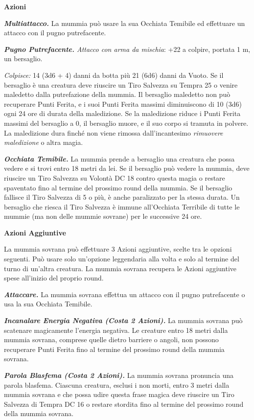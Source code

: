\begin{multicols}{2}
\textbf{Azioni}

\textit{\textbf{Multiattacco.}} La mummia può usare la sua Occhiata Temibile ed effettuare un attacco con il pugno putrefacente.

\textit{\textbf{Pugno Putrefacente.} Attacco con arma da mischia}: +22 a colpire, portata 1 m, un bersaglio.

\textit{Colpisce:} 14 (3d6 + 4) danni da botta più 21 (6d6) danni da Vuoto. Se il bersaglio è una creatura deve riuscire un Tiro Salvezza su Tempra 25 o venire maledetto dalla putrefazione della mummia. Il bersaglio maledetto non può recuperare Punti Ferita, e i suoi Punti Ferita massimi diminuiscono di 10 (3d6) ogni 24 ore di durata della maledizione. Se la maledizione riduce i Punti Ferita massimi del bersaglio a 0, il bersaglio muore, e il suo corpo si tramuta in polvere. La maledizione dura finché non viene rimossa dall'incantesimo \textit{rimuovere maledizione} o altra magia.

\textit{\textbf{Occhiata Temibile.}} La mummia prende a bersaglio una creatura che possa vedere e si trovi entro 18 metri da lei. Se il bersaglio può vedere la mummia, deve riuscire un Tiro Salvezza su Volontà DC 18 contro questa magia o restare spaventato fino al termine del prossimo round della mummia. Se il bersaglio fallisce il Tiro Salvezza di 5 o più, è anche paralizzato per la stessa durata. Un bersaglio che riesca il Tiro Salvezza è immune all'Occhiata Terribile di tutte le mummie (ma non delle mummie sovrane) per le successive 24 ore.

\textbf{Azioni Aggiuntive}

La mummia sovrana può effettuare 3 Azioni aggiuntive, scelte tra le opzioni seguenti. Può usare solo un'opzione leggendaria alla volta e solo al termine del turno di un'altra creatura. La mummia sovrana recupera le Azioni aggiuntive spese all'inizio del proprio round.

\textit{\textbf{Attaccare.}} La mummia sovrana effettua un attacco con il pugno putrefacente o usa la sua Occhiata Temibile.

\textit{\textbf{Incanalare Energia Negativa (Costa 2 Azioni).}} La mummia sovrana può scatenare magicamente l'energia negativa. Le creature entro 18 metri dalla mummia sovrana, comprese quelle dietro barriere o angoli, non possono recuperare Punti Ferita fino al termine del prossimo round della mummia sovrana.

\textit{\textbf{Parola Blasfema (Costa 2 Azioni).}} La mummia sovrana pronuncia una parola blasfema. Ciascuna creatura, esclusi i non morti, entro 3 metri dalla mummia sovrana e che possa udire questa frase magica deve riuscire un Tiro Salvezza di Tempra DC 16 o restare stordita fino al termine del prossimo round della mummia sovrana.


\end{multicols}
